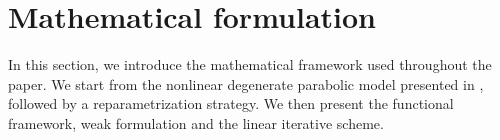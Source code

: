 \documentclass[review,11pt]{article}
\numberwithin{equation}{section}
\def \Om {\Omega}
\def \p  {\partial}
\def \R  {{\mathbb{R}}}
\begin{document}
\section{Mathematical formulation}\label{sec:setting}
In this section, we introduce the mathematical framework used throughout the paper. We start from the nonlinear degenerate parabolic model presented in , followed by a reparametrization strategy. We then present the functional framework, weak formulation and the linear iterative scheme.

\end{document}
